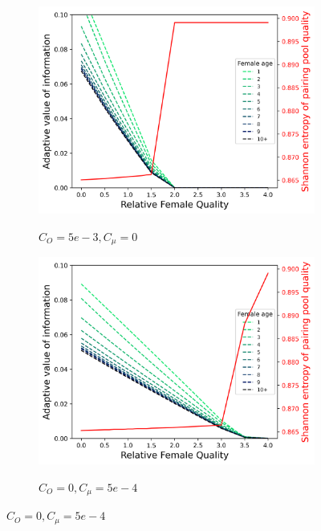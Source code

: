 \documentclass[10pt]{article} %
\begin{document}
\begin{figure}
\centering
\begin{subfigure}{.5\textwidth}
	\centering
	\caption{$C_O = 5e-3, C_\mu = 0$}
	\includegraphics[width=1.\linewidth]{../figures/FemQual.png}
	\label{fig:sub7}
\end{subfigure}%
\begin{subfigure}{.5\textwidth}
	\centering
	\caption{$C_O = 0, C_\mu = 5e-4$}
	\includegraphics[width=1.\linewidth]{../figures/FemQualmu.png}
	\label{fig:sub8}%
\end{subfigure}%


\end{figure}
\end{document}
